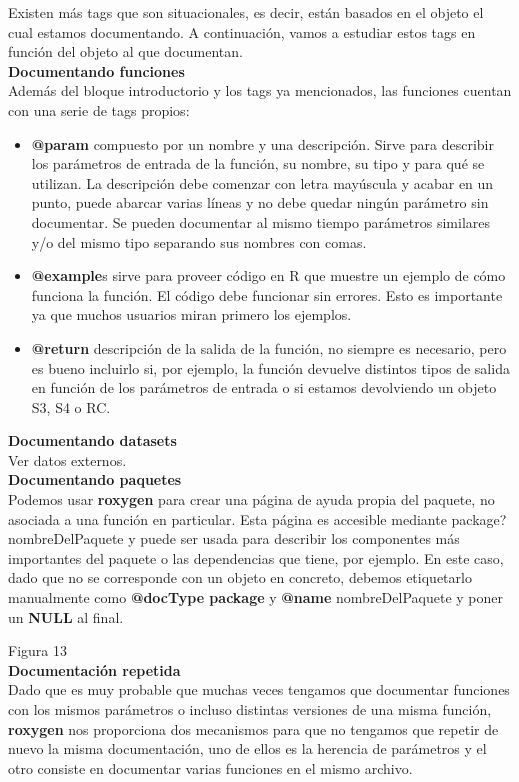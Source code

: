 Existen m\'as tags que son situacionales, es decir, est\'an basados en el objeto el cual estamos
documentando. A continuaci\'on, vamos a estudiar estos tags en funci\'on del objeto al que
documentan. \\
\textbf{Documentando funciones} \\
Adem\'as del bloque introductorio y los tags ya mencionados, las funciones cuentan con una
serie de tags propios:
\begin{itemize}
    \item \textbf{@param} compuesto por un nombre y una descripci\'on. Sirve para describir los
par\'ametros de entrada de la funci\'on, su nombre, su tipo y para qu\'e se utilizan.
La descripci\'on debe comenzar con letra may\'uscula y acabar en un punto, puede
abarcar varias l\'ineas y no debe quedar ning\'un par\'ametro sin documentar.
Se pueden documentar al mismo tiempo par\'ametros similares y/o del mismo tipo
separando sus nombres con comas.
    \item \textbf{@example}s sirve para proveer c\'odigo en R que muestre un ejemplo de c\'omo funciona
la funci\'on. El c\'odigo debe funcionar sin errores. Esto es importante ya que muchos
usuarios miran primero los ejemplos.
    \item \textbf{@return} descripci\'on de la salida de la funci\'on, no siempre es necesario, pero es
bueno incluirlo si, por ejemplo, la funci\'on devuelve distintos tipos de salida en funci\'on
de los par\'ametros de entrada o si estamos devolviendo un objeto S3, S4 o RC.
\end{itemize}

\textbf{Documentando datasets}\\
Ver datos externos.\\
\textbf{Documentando paquetes}\\

Podemos usar \textbf{roxygen} para crear una p\'agina de ayuda propia del paquete, no asociada a
una funci\'on en particular. Esta p\'agina es accesible mediante package?nombreDelPaquete y
puede ser usada para describir los componentes m\'as importantes del paquete o las
dependencias que tiene, por ejemplo.
En este caso, dado que no se corresponde con un objeto en concreto, debemos etiquetarlo
manualmente como \textbf{@docType package} y \textbf{@name} nombreDelPaquete y poner un \textbf{NULL} al
final.

Figura 13\\

\textbf{Documentaci\'on repetida}\\
Dado que es muy probable que muchas veces tengamos que documentar funciones con los
mismos par\'ametros o incluso distintas versiones de una misma funci\'on, \textbf{roxygen} nos
proporciona dos mecanismos para que no tengamos que repetir de nuevo la misma
documentaci\'on, uno de ellos es la herencia de par\'ametros y el otro consiste en documentar
varias funciones en el mismo archivo.

